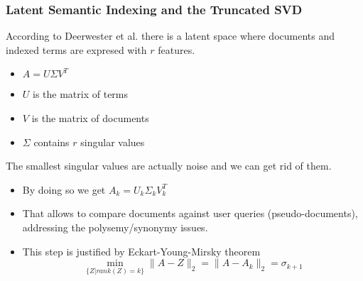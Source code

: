 \begin{frame}[plain]
  \frametitle{Latent Semantic Indexing and the Truncated SVD}
  \begin{block}{}
  According to Deerwester et al. there is a latent space
where documents and indexed terms are expresed with $r$ features.
  \begin{itemize}
    \item $A = U \Sigma V^{T}$
    \item $U$ is the matrix of terms
    \item $V$ is the matrix of documents
    \item $\Sigma$ contains $r$ singular values
  \end{itemize}

  The smallest singular values are actually noise and we can
get rid of them. 
  \begin{itemize}
    \item By doing so we get $A_k = U_k \Sigma_k V_k^{T}$
    \item That allows to compare documents against user queries
(pseudo-documents), addressing the polysemy/synonymy issues.
    \item This step is justified by Eckart-Young-Mirsky theorem 
\begin{equation} 
\min_{\{Z|rank(Z)=k\}} \|A-Z\|_{2} = \|A-A_{k}\|_{2} = \sigma_{k+1}
\end{equation}
  \end{itemize}
  \end{block}
\end{frame}
